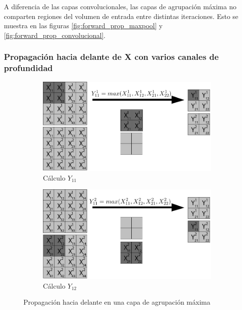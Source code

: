 A diferencia de las capas convolucionales, las capas de agrupación máxima no comparten regiones del volumen de entrada entre distintas iteraciones. Esto se muestra en las figuras \ref{fig:forward_prop_maxpool} y \ref{fig:forward_prop_convolucional}.


\subsubsection{Propagación hacia delante de X con varios canales de profundidad}

\begin{figure}[H]
	\centering
	\begin{subfigure}{.5\textwidth}
		\hspace{-10mm}
		\includegraphics[width=1.2\linewidth]{imagenes/maxpool_2capas_1.jpg}  
		\caption{Cálculo $Y_{11}$}
	\end{subfigure}%
	\begin{subfigure}{.5\textwidth}
		\hspace{10mm}
		\includegraphics[width=1.2\linewidth]{imagenes/maxpool_2capas_2.jpg}  
		\caption{Cálculo $Y_{12}$}
	\end{subfigure}
	
	\caption{Propagación hacia delante en una capa de agrupación máxima}
	\label{fig:forward_prop_maxpool_canales_profundidad}
\end{figure}

